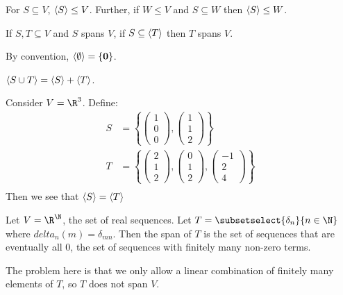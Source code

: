 \documentclass[../Main.tex]{subfiles}
\begin{document}
\begin{remarks}
    \item For $S \subseteq V$, $\left\langle S \right\rangle \leq V$. Further, if $W \leq V$ and $S \subseteq W$ then $\left\langle S \right\rangle \leq W$.
    \item If $S, T \subseteq V$ and $S$ spans $V$, if $S \subseteq \left\langle T \right\rangle$ then $T$ spans $V$.
    \item By convention, $\left\langle \emptyset \right\rangle = \{\boldsymbol{0}\}$.
    \item $\left\langle S \cup T \right\rangle = \left\langle S \right\rangle + \left\langle T \right\rangle$.
\end{remarks}
\begin{example}
    Consider $V = \R^3$. Define:
    \begin{align*}
        S &= \left\{\begin{pmatrix} 1 \\ 0 \\ 0\end{pmatrix}, \begin{pmatrix}1 \\ 1 \\ 2\end{pmatrix}\right\} \\
        T &= \left\{\begin{pmatrix} 2 \\ 1 \\ 2\end{pmatrix}, \begin{pmatrix}0 \\ 1 \\ 2\end{pmatrix}, \begin{pmatrix}-1 \\ 2 \\ 4\end{pmatrix}\right\} \\
    \end{align*}
    Then we see that $\left\langle S \right\rangle = \left\langle T \right\rangle$
    \label{ex3DSpanningSets}
\end{example}
\begin{example}
    Let $V = \R^{\N}$, the set of real sequences. Let $T = \subsetselect{\delta_n}{n \in \N}$ where $delta_n(m) = \delta_{mn}$. Then the span of $T$ is the set of sequences that are eventually all $0$, the set of sequences with finitely many non-zero terms.

    The problem here is that we only allow a linear combination of finitely many elements of $T$, so $T$ does not span $V$.
\end{example}
\end{document}
